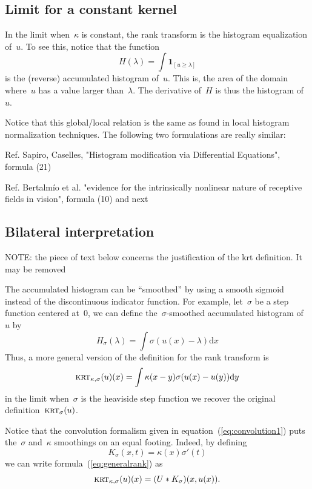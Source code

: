 \documentclass[12pt]{article}                  %
\begin{document}
\subsection{Limit for a constant kernel}

In the limit when~$\kappa$ is constant, the rank transform is the histogram
equalization of~$u$.  To see this, notice that the function
\[
H(\lambda) = \int\mathbf{1}_{[u\ge\lambda]}
\]
is the (reverse) accumulated histogram of~$u$.  This is, the area of the domain
where~$u$ has a value larger than~$\lambda$.  The derivative of~$H$ is thus the
histogram of~$u$.

Notice that this global/local relation is the same as found in local
histogram normalization techniques.
The following two formulations are really similar:

Ref. Sapiro, Caselles,  "Histogram modification via Differential Equations",
formula (21)~\cite{sapiro1997histogram}

Ref. Bertalmío et al. "evidence for the intrinsically nonlinear nature of
receptive fields in vision", formula (10) and next~\cite{bertalmio2020evidence}


\subsection{Bilateral interpretation}

NOTE: the piece of text below concerns the justification of the krt
definition.  It may be removed 

The accumulated histogram can be ``smoothed'' by using a smooth sigmoid instead
of the discontinuous indicator function.  For example, let~$\sigma$ be a step
function centered at~$0$, we can define the~$\sigma$-smoothed accumulated
histogram of~$u$ by
\[
H_\sigma(\lambda)=\int\sigma(u(x)-\lambda)\mathrm{d}x
\]
Thus, a more general version of the definition for the rank transform is
\begin{equation}\label{eq:generalrank}
	\textsc{krt}_{\kappa,\sigma}(u)(x)=\int \kappa(x-y)\sigma(u(x)-u(y))\mathrm{d}y
\end{equation}
in the limit when~$\sigma$ is the heaviside step function we recover the
original definition~$\textsc{krt}_\sigma(u)$.

Notice that the convolution formalism given in
equation~(\ref{eq:convolution1}) puts the~$\sigma$ and~$\kappa$ smoothings
on an equal footing.  Indeed, by defining
\[
	K_\sigma(x,t)=\kappa(x)\sigma'(t)
\]
we can write formula~(\ref{eq:generalrank}) as
\begin{equation}\label{eq:convolution2}
	\textsc{krt}_{\kappa,\sigma}(u)(x)=(U*K_\sigma)(x,u(x)).
\end{equation}
\end{document}
